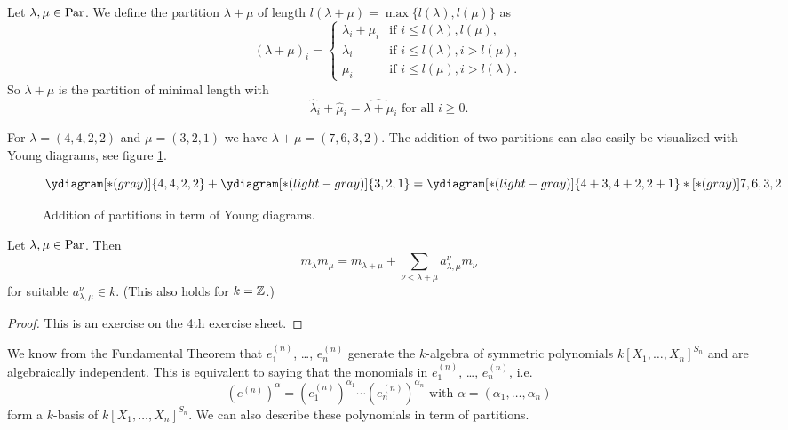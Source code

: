 \begin{defi}
  Let $\lambda, \mu \in \operatorname{Par}$.
  We define the partition $\lambda+\mu$ of length $l(\lambda+\mu) = \max\{ l(\lambda), l(\mu) \}$ as
  \[
      (\lambda+\mu)_i
    = \begin{cases}
        \lambda_i + \mu_i & \text{if } i \leq l(\lambda),l(\mu),      \\
        \lambda_i         & \text{if } i \leq l(\lambda), i > l(\mu), \\
        \mu_i             & \text{if } i \leq l(\mu), i > l(\lambda).
      \end{cases}
  \]
  So $\lambda+\mu$ is the partition of minimal length with
  \[
      \hat{\lambda}_i + \hat{\mu}_i
    = \widehat{\lambda + \mu}_i
    \text{ for all }
    i \geq 0.
  \]
\end{defi}


\begin{expl}
  For $\lambda = (4,4,2,2)$ and $\mu = (3,2,1)$ we have $\lambda + \mu = (7,6,3,2)$.
  The addition of two partitions can also easily be visualized with Young diagrams, see figure \ref{fig: addition partition young diagrams}.
  \begin{figure}\centering
    \[
        \ydiagram[*(gray)]{4,4,2,2} + \ydiagram[*(light-gray)]{3,2,1}
      = \ydiagram[*(light-gray)] {4+3,4+2,2+1} *[*(gray)]{7,6,3,2}
    \]
    \caption{Addition of partitions in term of Young diagrams.}
    \label{fig: addition partition young diagrams}
  \end{figure}
\end{expl}


\begin{lem}
  Let $\lambda, \mu \in \operatorname{Par}$.
  Then
  \[
      m_{\lambda} m_{\mu}
    =   m_{\lambda + \mu}
      + \sum_{\nu < \lambda + \mu} a^\nu_{\lambda,\mu} m_\nu
  \]
  for suitable $a^\nu_{\lambda,\mu} \in k$.
  (This also holds for $k = \mathbb{Z}$.)
\end{lem}
\begin{proof}
  This is an exercise on the 4th exercise sheet.
\end{proof}


We know from the Fundamental Theorem that $e^{(n)}_1$, \dots, $e^{(n)}_n$ generate the $k$-algebra of symmetric polynomials $k[X_1, \dotsc, X_n]^{S_n}$ and are algebraically independent. This is equivalent to saying that the monomials in $e^{(n)}_1$, \dots, $e^{(n)}_n$, i.e.\
\[
    \left( e^{(n)} \right)^\alpha
  = \left( e^{(n)}_1 \right)^{\alpha_1} \dotsm \left( e^{(n)}_n \right)^{\alpha_n}
  \text{ with }
  \alpha = (\alpha_1, \dotsc, \alpha_n)
\]
form a $k$-basis of $k[X_1, \dotsc, X_n]^{S_n}$.
We can also describe these polynomials in term of partitions.


